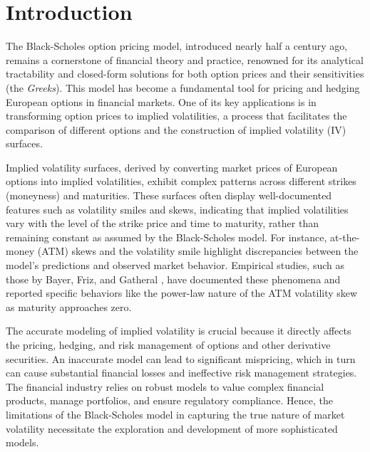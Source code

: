 \documentclass{article}
\theoremstyle{remark}
\begin{document}
\tableofcontents
\newpage

\section{Introduction}
The Black-Scholes option pricing model, introduced nearly half a century ago, remains a cornerstone of financial theory and practice,
renowned for its analytical tractability and closed-form solutions for both option prices and their sensitivities (the \emph{Greeks}).
This model has become a fundamental tool for pricing and hedging European options in financial markets.
One of its key applications is in transforming option prices to implied volatilities, a process that facilitates
the comparison of different options and the construction of implied volatility (IV) surfaces.

Implied volatility surfaces, derived by converting market prices of European options into implied volatilities,
exhibit complex patterns across different strikes (moneyness) and maturities.
These surfaces often display well-documented features such as volatility smiles and skews,
indicating that implied volatilities vary with the level of the strike price and time to maturity,
rather than remaining constant as assumed by the Black-Scholes model.
For instance, at-the-money (ATM) skews and the volatility smile highlight discrepancies between the model's predictions
and observed market behavior. Empirical studies, such as those by Bayer, Friz, and Gatheral \cite{BFG15}, have documented these phenomena
and reported specific behaviors like the power-law nature of the ATM volatility skew as maturity approaches zero.

The accurate modeling of implied volatility is crucial because it directly affects the pricing, hedging, and risk management of options
and other derivative securities.
An inaccurate model can lead to significant mispricing, which in turn can cause substantial financial losses
and ineffective risk management strategies.
The financial industry relies on robust models to value complex financial products,
manage portfolios, and ensure regulatory compliance.
Hence, the limitations of the Black-Scholes model in capturing the true nature of market volatility necessitate
the exploration and development of more sophisticated models.
\end{document}
